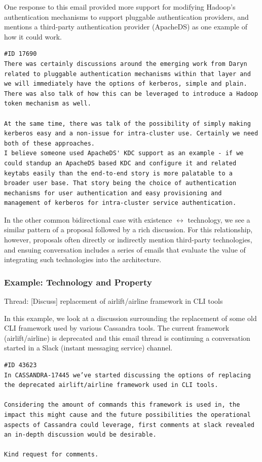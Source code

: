 \documentclass[a4paper, 12pt]{article}
\begin{document}
			One response to this email provided more support for modifying Hadoop's authentication mechanisms to support pluggable authentication providers, and mentions a third-party authentication provider (ApacheDS) as one example of how it could work.
			
			\begin{verbatim}
#ID 17690
There was certainly discussions around the emerging work from Daryn related to pluggable authentication mechanisms within that layer and we will immediately have the options of kerberos, simple and plain. There was also talk of how this can be leveraged to introduce a Hadoop token mechanism as well. 

At the same time, there was talk of the possibility of simply making kerberos easy and a non-issue for intra-cluster use. Certainly we need both of these approaches.
I believe someone used ApacheDS' KDC support as an example - if we could standup an ApacheDS based KDC and configure it and related keytabs easily than the end-to-end story is more palatable to a broader user base. That story being the choice of authentication mechanisms for user authentication and easy provisioning and management of kerberos for intra-cluster service authentication.
			\end{verbatim}
		
	
		In the other common bidirectional case with existence $ \leftrightarrow $ technology, we see a similar pattern of a proposal followed by a rich discussion. For this relationship, however, proposals often directly or indirectly mention third-party technologies, and ensuing conversation includes a series of emails that evaluate the value of integrating such technologies into the architecture.
		
		\subsubsection{Example: Technology and Property}
			\footnotesize
				Thread: [Discuss] replacement of airlift/airline framework in CLI tools
			\normalsize
			
			In this example, we look at a discussion surrounding the replacement of some old CLI framework used by various Cassandra tools. The current framework (airlift/airline) is deprecated and this email thread is continuing a conversation started in a Slack (instant messaging service) channel.
			
			\begin{verbatim}
#ID 43623
In CASSANDRA-17445 we’ve started discussing the options of replacing the deprecated airlift/airline framework used in CLI tools.

Considering the amount of commands this framework is used in, the impact this might cause and the future possibilities the operational aspects of Cassandra could leverage, first comments at slack revealed an in-depth discussion would be desirable.

Kind request for comments.
			\end{verbatim}
		
\end{document}
